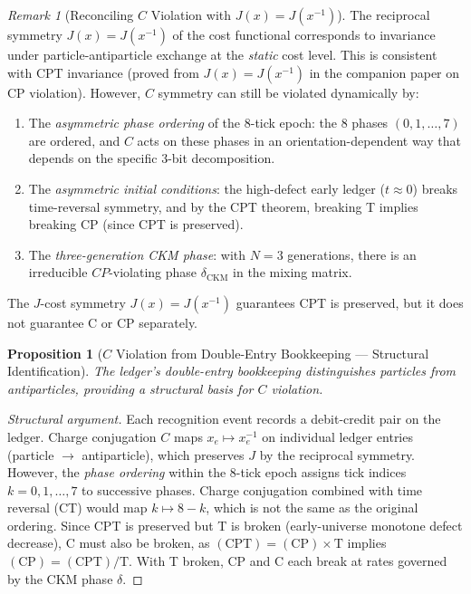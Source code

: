 \documentclass[12pt,a4paper]{article}
\newtheorem{proposition}[theorem]{Proposition}
\theoremstyle{definition}
\theoremstyle{remark}
\newtheorem{remark}[theorem]{Remark}
\begin{document}
\begin{remark}[Reconciling $C$ Violation with $J(x) = J(x^{-1})$]
\label{rem:c-reconcile}
The reciprocal symmetry $J(x) = J(x^{-1})$ of the cost functional
corresponds to invariance under particle-antiparticle exchange at the
\emph{static} cost level.  This is consistent with CPT invariance
(proved from $J(x)=J(x^{-1})$ in the companion paper on CP
violation).  However, $C$ symmetry can still be violated dynamically
by:
\begin{enumerate}[nosep,label=(\roman*)]
  \item The \emph{asymmetric phase ordering} of the 8-tick epoch:
  the 8 phases $(0,1,\ldots,7)$ are ordered, and $C$ acts on these
  phases in an orientation-dependent way that depends on the
  specific 3-bit decomposition.
  \item The \emph{asymmetric initial conditions}: the high-defect
  early ledger ($t \approx 0$) breaks time-reversal symmetry, and
  by the CPT theorem, breaking T implies breaking CP (since CPT is
  preserved).
  \item The \emph{three-generation CKM phase}: with $N = 3$
  generations, there is an irreducible $CP$-violating phase
  $\delta_{\mathrm{CKM}}$ in the mixing matrix.
\end{enumerate}
The $J$-cost symmetry $J(x) = J(x^{-1})$ guarantees CPT is preserved,
but it does not guarantee C or CP separately.
\end{remark}

\begin{proposition}[$C$ Violation from Double-Entry Bookkeeping --- Structural Identification]
\label{thm:c-violation}
The ledger's double-entry bookkeeping distinguishes particles from
antiparticles, providing a structural basis for $C$ violation.
\end{proposition}

\begin{proof}[Structural argument]
Each recognition event records a debit-credit pair on the ledger.
Charge conjugation $C$ maps $x_e \mapsto x_e^{-1}$ on individual
ledger entries (particle $\to$ antiparticle), which preserves $J$
by the reciprocal symmetry.  However, the \emph{phase ordering}
within the 8-tick epoch assigns tick indices $k = 0, 1, \ldots, 7$
to successive phases.  Charge conjugation combined with time
reversal (CT) would map $k \mapsto 8 - k$, which is not the same
as the original ordering.  Since CPT is preserved but T is broken
(early-universe monotone defect decrease), C must also be broken,
as $(\text{CPT}) = (\text{CP}) \times \text{T}$ implies
$(\text{CP}) = (\text{CPT})/\text{T}$.  With T broken, CP and C
each break at rates governed by the CKM phase $\delta$.
\end{proof}
\end{document}
